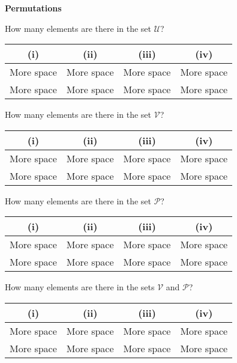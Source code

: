 \documentclass[]{report}
\begin{document}
	\textbf{Permutations}
	
	How many elements are there in the set $\mathcal{U}$?
	\begin{center}
		\begin{tabular}{|c|c|c|c|}
			\hline (i) &  (ii) &  (iii) &  (iv) \\ 
			\hline {\color{white}More space} &{\color{white}More space}  & {\color{white}More space} &{\color{white}More space}  \\ 
			{\color{white}More space} &{\color{white}More space}  & {\color{white}More space} &{\color{white}More space}  \\ 
			\hline 
		\end{tabular} 
	\end{center}
	
	
	
	
	How many elements are there in the set $\mathcal{V}$?
	\begin{center}
		\begin{tabular}{|c|c|c|c|}
			\hline (i) &  (ii) &  (iii) &  (iv) \\ 
			\hline {\color{white}More space} &{\color{white}More space}  & {\color{white}More space} &{\color{white}More space}  \\ 
			{\color{white}More space} &{\color{white}More space}  & {\color{white}More space} &{\color{white}More space}  \\ 
			\hline 
		\end{tabular} 
	\end{center}
	
	
	
	
	How many elements are there in the set $\mathcal{P}$?
	\begin{center}
		\begin{tabular}{|c|c|c|c|}
			\hline (i) &  (ii) &  (iii) &  (iv) \\ 
			\hline {\color{white}More space} &{\color{white}More space}  & {\color{white}More space} &{\color{white}More space}  \\ 
			{\color{white}More space} &{\color{white}More space}  & {\color{white}More space} &{\color{white}More space}  \\ 
			\hline 
		\end{tabular} 
	\end{center}
	
	
	
	
	How many elements are there in the sets $\mathcal{V}$ and $\mathcal{P}$?
	\begin{center}
		\begin{tabular}{|c|c|c|c|}
			\hline (i) &  (ii) &  (iii) &  (iv) \\ 
			\hline {\color{white}More space} &{\color{white}More space}  & {\color{white}More space} &{\color{white}More space}  \\ 
			{\color{white}More space} &{\color{white}More space}  & {\color{white}More space} &{\color{white}More space}  \\ 
			\hline 
		\end{tabular} 
	\end{center}
	
\end{document}
